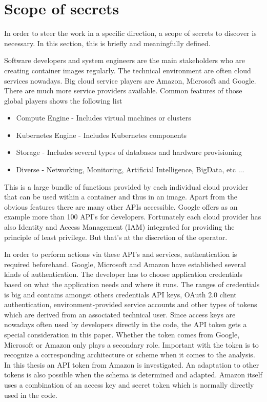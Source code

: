 \section{Scope of secrets}
\label{ch:theory:scope_secrets}
In order to steer the work in a specific direction, a scope of secrets to discover is necessary. In this section, this is briefly and meaningfully defined.

Software developers and system engineers are the main stakeholders who are creating container images regularly. The technical environment are often cloud services nowadays. Big cloud service players are Amazon, Microsoft and Google. There are much more service providers available. Common features of those global players shows the following list
\begin{itemize}
\item Compute Engine - Includes virtual machines or clusters
\item Kubernetes Engine - Includes Kubernetes components
\item Storage - Includes several types of databases and hardware provisioning
\item Diverse - Networking, Monitoring, Artificial Intelligence, BigData, etc ...
\end{itemize}

This is a large bundle of functions provided by each individual cloud provider that can be used within a container and thus in an image.
Apart from the obvious features there are many other APIs accessible. Google offers as an example more than 100 API's for developers.
Fortunately each cloud provider has also Identity and Access Management (IAM) integrated for providing the principle of least privilege. But that's at the discretion of the operator.

In order to perform actions via these API's and services, authentication is required beforehand. Google, Microsoft and Amazon have established several kinds of authentication. 
The developer has to choose application credentials based on what the application needs and where it runs.
The ranges of credentials is big and contains amongst others credentials API keys, OAuth 2.0 client authentication, environment-provided service accounts and other types of tokens which are derived from an associated technical user.
Since access keys are nowadays often used by developers directly in the code, the API token gets a special consideration in this paper.
Whether the token comes from Google, Microsoft or Amazon only plays a secondary role. Important with the token is to recognize a corresponding architecture or scheme when it comes to the analysis.
In this thesis an API token from Amazon is investigated. An adaptation to other tokens is also possible when the schema is determined and adapted.
Amazon itself uses a combination of an access key and secret token which is normally directly used in the code.

